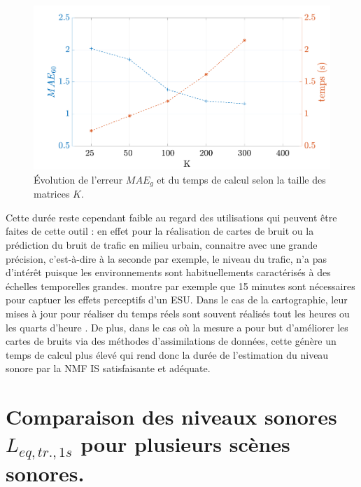 \begin{figure}
\centering
\includegraphics[width=.7\linewidth]{./figures/resultats/timeErrorNMF_IS_K.pdf}
\caption{Évolution de l'erreur $MAE_g$ et du temps de calcul selon la taille des matrices $K$.} 
\label{fig:errorTime}
\end{figure}

Cette durée reste cependant faible au regard des utilisations qui peuvent être faites de cette outil : en effet pour la réalisation de cartes de bruit ou la prédiction du bruit de trafic en milieu urbain, connaitre avec une grande précision, c'est-à-dire à la seconde par exemple, le niveau du trafic, n'a pas d'intérêt puisque les environnements sont habituellements caractérisés à des échelles temporelles grandes. \cite{broccoline} montre par exemple que 15 minutes sont nécessaires pour captuer les effets perceptifs d'un ESU. Dans le cas de la cartographie, leur mises à jour pour réaliser du temps réels sont souvent réalisés tout les heures \cite{} ou les quarts d'heure \cite{wei2016dynamic}. De plus, dans le cas où la mesure a pour but d'améliorer les cartes de bruits via des méthodes d'assimilations de données, cette génère un temps de calcul plus élevé qui rend donc la durée de l'estimation du niveau sonore par la NMF IS satisfaisante et adéquate.

\section{Comparaison des niveaux sonores $L_{eq,tr.,1s}$ pour plusieurs scènes sonores.}

